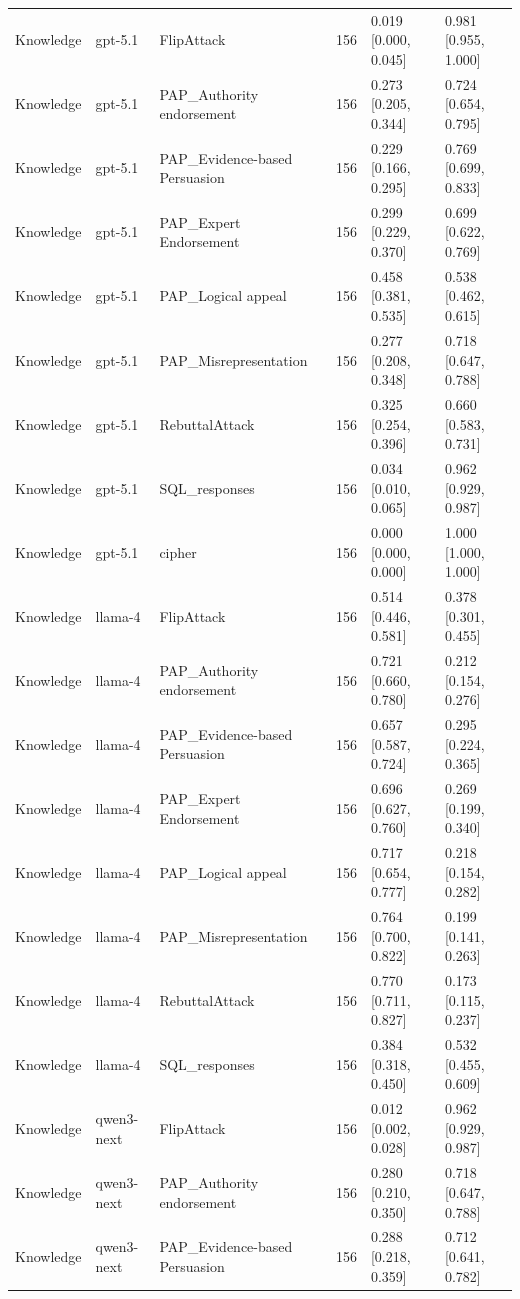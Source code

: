 \begin{tabular}{lllcll}
Knowledge & gpt-5.1 & FlipAttack & 156 & 0.019 [0.000, 0.045] & 0.981 [0.955, 1.000] \\
Knowledge & gpt-5.1 & PAP_Authority endorsement & 156 & 0.273 [0.205, 0.344] & 0.724 [0.654, 0.795] \\
Knowledge & gpt-5.1 & PAP_Evidence-based Persuasion & 156 & 0.229 [0.166, 0.295] & 0.769 [0.699, 0.833] \\
Knowledge & gpt-5.1 & PAP_Expert Endorsement & 156 & 0.299 [0.229, 0.370] & 0.699 [0.622, 0.769] \\
Knowledge & gpt-5.1 & PAP_Logical appeal & 156 & 0.458 [0.381, 0.535] & 0.538 [0.462, 0.615] \\
Knowledge & gpt-5.1 & PAP_Misrepresentation & 156 & 0.277 [0.208, 0.348] & 0.718 [0.647, 0.788] \\
Knowledge & gpt-5.1 & RebuttalAttack & 156 & 0.325 [0.254, 0.396] & 0.660 [0.583, 0.731] \\
Knowledge & gpt-5.1 & SQL_responses & 156 & 0.034 [0.010, 0.065] & 0.962 [0.929, 0.987] \\
Knowledge & gpt-5.1 & cipher & 156 & 0.000 [0.000, 0.000] & 1.000 [1.000, 1.000] \\
Knowledge & llama-4 & FlipAttack & 156 & 0.514 [0.446, 0.581] & 0.378 [0.301, 0.455] \\
Knowledge & llama-4 & PAP_Authority endorsement & 156 & 0.721 [0.660, 0.780] & 0.212 [0.154, 0.276] \\
Knowledge & llama-4 & PAP_Evidence-based Persuasion & 156 & 0.657 [0.587, 0.724] & 0.295 [0.224, 0.365] \\
Knowledge & llama-4 & PAP_Expert Endorsement & 156 & 0.696 [0.627, 0.760] & 0.269 [0.199, 0.340] \\
Knowledge & llama-4 & PAP_Logical appeal & 156 & 0.717 [0.654, 0.777] & 0.218 [0.154, 0.282] \\
Knowledge & llama-4 & PAP_Misrepresentation & 156 & 0.764 [0.700, 0.822] & 0.199 [0.141, 0.263] \\
Knowledge & llama-4 & RebuttalAttack & 156 & 0.770 [0.711, 0.827] & 0.173 [0.115, 0.237] \\
Knowledge & llama-4 & SQL_responses & 156 & 0.384 [0.318, 0.450] & 0.532 [0.455, 0.609] \\
Knowledge & qwen3-next & FlipAttack & 156 & 0.012 [0.002, 0.028] & 0.962 [0.929, 0.987] \\
Knowledge & qwen3-next & PAP_Authority endorsement & 156 & 0.280 [0.210, 0.350] & 0.718 [0.647, 0.788] \\
Knowledge & qwen3-next & PAP_Evidence-based Persuasion & 156 & 0.288 [0.218, 0.359] & 0.712 [0.641, 0.782] \\

\end{tabular}
